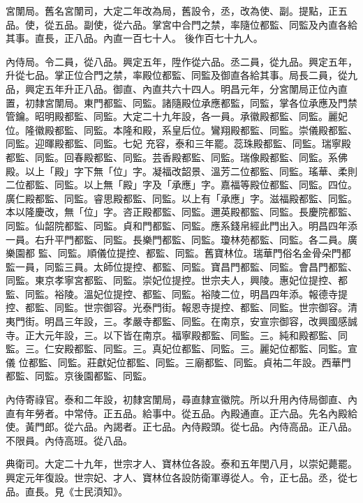 \begin{pinyinscope}
 宮闈局。舊名宮闈司，大定二年改為局，舊設令，丞，改為使、副。提點，正五品。使，從五品。副使，從六品。掌宮中合門之禁，率隨位都監、同監及內直各給其事。直長，正八品。內直一百七十人。
 後作百七十九人。



 內侍局。令二員，從八品。興定五年，陞作從六品。丞二員，從九品。興定五年，升從七品。掌正位合門之禁，率殿位都監、同監及御直各給其事。局長二員，從九品，興定五年升正八品。御直、內直共六十四人。明昌元年，分宮闈局正位內直置，初隸宮闈局。東門都監、同監。諸隨殿位承應都監，同監，掌各位承應及門禁管鑰。昭明殿都監、同監。大定二十九年設，各一員。承徽殿都監、同監。麗妃位。隆徽殿都監、同監。本隆和殿，系皇后位。鸞翔殿都監、同監。崇儀殿都監、同監。迎暉殿都監、同監。七妃
 充容，泰和三年罷。蕊珠殿都監、同監。瑞寧殿都監、同監。回春殿都監、同監。芸香殿都監、同監。瑞像殿都監、同監。系佛殿。以上「殿」字下無「位」字。凝福改韶景、溫芳二位都監、同監。瑤華、柔則二位都監、同監。以上無「殿」字及「承應」字。嘉福等殿位都監、同監。四位。廣仁殿都監、同監。睿思殿都監、同監。以上有「承應」字。滋福殿都監、同監。本以隆慶改，無「位」字。咨正殿都監、同監。邇英殿都監、同監。長慶院都監、同監。仙韶院都監、同監。貞和門都監、同監。應系錢帛經此門出入。明昌四年添一員。右升平門都監、同監。長樂門都監、同監。瓊林苑都監、同監。各二員。廣樂園都
 監、同監。順儀位提控、都監、同監。舊寶林位。瑞華門俗名金骨朵門都監一員，同監三員。太師位提控、都監、同監。寶昌門都監、同監。會昌門都監、同監。東京孝寧宮都監、同監。崇妃位提控。世宗夫人，興陵。惠妃位提控、都監、同監。裕陵。溫妃位提控、都監、同監。裕陵二位，明昌四年添。報德寺提控、都監、同監。世宗御容。光泰門街。報恩寺提控、都監、同監。世宗御容。清夷門街。明昌三年設，三。孝嚴寺都監、同監。在南京，安宣宗御容，改興國感誠寺。正大元年設，三。以下皆在南京。福寧殿都監、同監。三。純和殿都監、同監。三。仁安殿都監、同監。三。真妃位都監、同監。三。麗妃位都監、同監。宣儀
 位都監、同監。莊獻妃位都監、同監。三廟都監、同監。貞祐二年設。西華門都監、同監。京後園都監、同監。



 內侍寄祿官。泰和二年設，初隸宮闈局，尋直隸宣徽院。所以升用內侍局御直、內直有年勞者。中常侍。正五品。給事中。從五品。內殿通直。正六品。先名內殿給使。黃門郎。從六品。內謁者。正七品。內侍殿頭。從七品。內侍高品。正八品。不限員。內侍高班。從八品。



 典衛司。大定二十九年，世宗才人、寶林位各設。泰和五年閏八月，以崇妃薨罷。興定元年復設。世宗妃、才人、寶林位各設防衛軍導從人。令，正七品。丞，從七品。直長。見《士民湏知》。




\end{pinyinscope}
